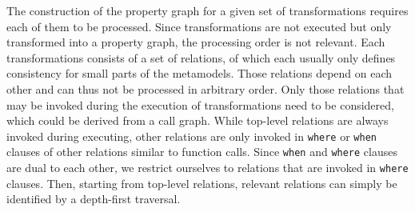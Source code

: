 

The construction of the property graph for a given set of \qvtr transformations requires each of them to be processed.
Since transformations are not executed but only transformed into a property graph, the processing order is not relevant.
Each transformations consists of a set of \qvtr relations, of which each usually only defines consistency for small parts of the metamodels.
Those relations depend on each other and can thus not be processed in arbitrary order.
Only those relations that may be invoked during the execution of transformations need to be considered, which could be derived from a call graph.
While top-level relations are always invoked during executing, other relations are only invoked in \texttt{where} or \texttt{when} clauses of other relations similar to function calls. 
Since \texttt{when} and \texttt{where} clauses are dual to each other, we restrict ourselves to relations that are invoked in \texttt{where} clauses. 
Then, starting from top-level relations, relevant relations can simply be identified by a depth-first traversal. 


